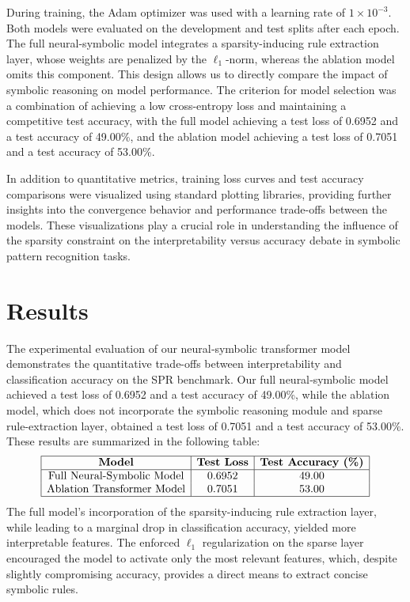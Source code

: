 \documentclass{article}
\begin{document}
During training, the Adam optimizer was used with a learning rate of \(1 \times 10^{-3}\). Both models were evaluated on the development and test splits after each epoch. The full neural-symbolic model integrates a sparsity-inducing rule extraction layer, whose weights are penalized by the \(\ell_1\)-norm, whereas the ablation model omits this component. This design allows us to directly compare the impact of symbolic reasoning on model performance. The criterion for model selection was a combination of achieving a low cross-entropy loss and maintaining a competitive test accuracy, with the full model achieving a test loss of 0.6952 and a test accuracy of 49.00\%, and the ablation model achieving a test loss of 0.7051 and a test accuracy of 53.00\%.

In addition to quantitative metrics, training loss curves and test accuracy comparisons were visualized using standard plotting libraries, providing further insights into the convergence behavior and performance trade-offs between the models. These visualizations play a crucial role in understanding the influence of the sparsity constraint on the interpretability versus accuracy debate in symbolic pattern recognition tasks.

\section{Results}
The experimental evaluation of our neural‐symbolic transformer model demonstrates the quantitative trade-offs between interpretability and classification accuracy on the SPR benchmark. Our full neural‐symbolic model achieved a test loss of 0.6952 and a test accuracy of 49.00\%, while the ablation model, which does not incorporate the symbolic reasoning module and sparse rule-extraction layer, obtained a test loss of 0.7051 and a test accuracy of 53.00\%. These results are summarized in the following table:
\[
\begin{array}{|c|c|c|}
\hline
\textbf{Model} & \textbf{Test Loss} & \textbf{Test Accuracy (\%)} \\
\hline
\text{Full Neural-Symbolic Model} & 0.6952 & 49.00 \\
\text{Ablation Transformer Model} & 0.7051 & 53.00 \\
\hline
\end{array}
\]
The full model’s incorporation of the sparsity-inducing rule extraction layer, while leading to a marginal drop in classification accuracy, yielded more interpretable features. The enforced \(\ell_1\) regularization on the sparse layer encouraged the model to activate only the most relevant features, which, despite slightly compromising accuracy, provides a direct means to extract concise symbolic rules.
\end{document}
